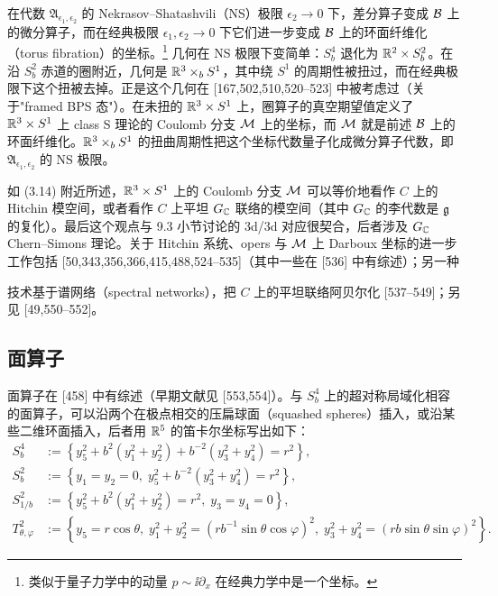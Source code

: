 在代数 $\mathfrak{A}_{\epsilon_1,\epsilon_2}$ 的 Nekrasov--Shatashvili（NS）极限 $\epsilon_2\to0$ 下，差分算子变成 $\mathcal{B}$ 上的微分算子，而在经典极限 $\epsilon_1,\epsilon_2\to0$ 下它们进一步变成 $\mathcal{B}$ 上的环面纤维化（torus fibration）的坐标。\footnote{类似于量子力学中的动量 $p\sim\ii\partial_x$ 在经典力学中是一个坐标。} 几何在 NS 极限下变简单：$S^4_b$ 退化为 $\mathbb{R}^2\times S^2_b$。在沿 $S^2_b$ 赤道的圈附近，几何是 $\mathbb{R}^3\times_b S^1$，其中绕 $S^1$ 的周期性被扭过，而在经典极限下这个扭被去掉。正是这个几何在 [167,502,510,520--523] 中被考虑过（关于"framed BPS 态"）。在未扭的 $\mathbb{R}^3\times S^1$ 上，圈算子的真空期望值定义了 $\mathbb{R}^3\times S^1$ 上 class S 理论的 Coulomb 分支 $\mathcal{M}$ 上的坐标，而 $\mathcal{M}$ 就是前述 $\mathcal{B}$ 上的环面纤维化。$\mathbb{R}^3\times_b S^1$ 的扭曲周期性把这个坐标代数量子化成微分算子代数，即 $\mathfrak{A}_{\epsilon_1,\epsilon_2}$ 的 NS 极限。

如 (3.14) 附近所述，$\mathbb{R}^3\times S^1$ 上的 Coulomb 分支 $\mathcal{M}$ 可以等价地看作 $C$ 上的 Hitchin 模空间，或者看作 $C$ 上平坦 $G_{\mathbb{C}}$ 联络的模空间（其中 $G_{\mathbb{C}}$ 的李代数是 $\mathfrak{g}$ 的复化）。最后这个观点与 9.3 小节讨论的 3d/3d 对应很契合，后者涉及 $G_{\mathbb{C}}$ Chern--Simons 理论。关于 Hitchin 系统、opers 与 $\mathcal{M}$ 上 Darboux 坐标的进一步工作包括 [50,343,356,366,415,488,524--535]（其中一些在 [536] 中有综述）；另一种

技术基于谱网络（spectral networks），把 $C$ 上的平坦联络阿贝尔化 [537--549]；另见 [49,550--552]。

\subsection{面算子}

面算子在 [458] 中有综述（早期文献见 [553,554]）。与 $S^4_b$ 上的超对称局域化相容的面算子，可以沿两个在极点相交的压扁球面（squashed spheres）插入，或沿某些二维环面插入，后者用 $\mathbb{R}^5$ 的笛卡尔坐标写出如下：
\begin{equation}
\begin{aligned}
    S^4_b&:=\left\{y_5^2+b^2(y_1^2+y_2^2)+b^{-2}(y_3^2+y_4^2)=r^2\right\},\\
    S^2_b&:=\left\{y_1=y_2=0,\;y_5^2+b^{-2}(y_3^2+y_4^2)=r^2\right\},\\
    S^2_{1/b}&:=\left\{y_5^2+b^2(y_1^2+y_2^2)=r^2,\;y_3=y_4=0\right\},\\
    T^2_{\theta,\varphi}&:=\left\{y_5=r\cos\theta,\;y_1^2+y_2^2=(rb^{-1}\sin\theta\cos\varphi)^2,\;y_3^2+y_4^2=(rb\sin\theta\sin\varphi)^2\right\}.
\end{aligned}
    \tag{8.6}
\end{equation}

